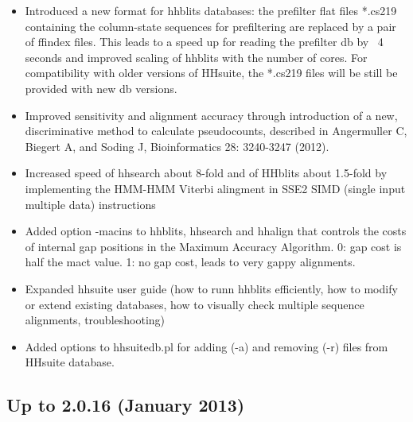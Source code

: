 \documentclass[11pt,a4paper]{article}
\begin{document}
\begin{itemize}
\item Introduced a new format for hhblits databases: the prefilter flat files 
  *.cs219 containing the column-state sequences for prefiltering are replaced
  by a pair of ffindex files. This leads to a speed up for reading the prefilter 
  db by ~4 seconds and improved scaling of hhblits with the number of cores. 
  For compatibility with older versions of HHsuite, the *.cs219 files will 
  be still be provided with new db versions.

\item Improved sensitivity and alignment accuracy through introduction of a new,
  discriminative method to calculate pseudocounts, described in Angermuller C, 
  Biegert A, and Soding J, Bioinformatics 28: 3240-3247 (2012).

\item Increased speed of hhsearch about 8-fold and of HHblits about 1.5-fold by 
  implementing the HMM-HMM Viterbi alingment in SSE2 SIMD (single input 
  multiple data) instructions 

\item Added option -macins to hhblits, hhsearch and hhalign that controls the
  costs of internal gap positions in the Maximum Accuracy Algorithm. 
  0: gap cost is half the mact value. 1: no gap cost, leads to very gappy 
  alignments.

\item Expanded hhsuite user guide (how to runn hhblits efficiently, how to 
  modify or extend existing databases, how to visually check multiple sequence 
  alignments, troubleshooting)

\item Added options to hhsuitedb.pl for adding (-a) and removing (-r) files 
  from HHsuite database.

\end{itemize}

\subsection{Up to 2.0.16 (January 2013)}
\end{document}
